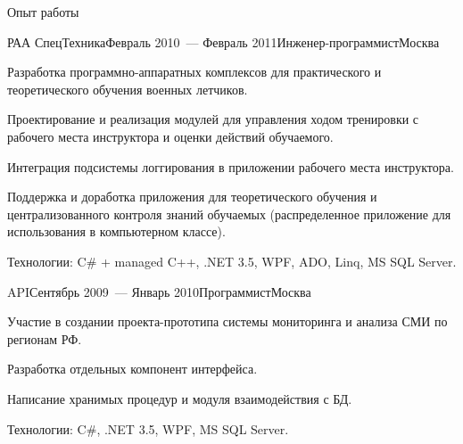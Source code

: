 \documentclass{resume} %
\begin{document}
\begin{rSection}{Опыт работы}
\begin{rSubsection}{РАА СпецТехника}{Февраль 2010~--- Февраль 2011}{Инженер-программист}{Москва}
\item Разработка программно-аппаратных комплексов для практического и теоретического обучения военных
летчиков.
\item Проектирование и реализация модулей для управления ходом тренировки с рабочего места инструктора 
и оценки действий обучаемого.
\item Интеграция подсистемы логгирования в приложении рабочего места инструктора.
\item Поддержка и доработка приложения для теоретического обучения и централизованного контроля знаний 
обучаемых (распределенное приложение для использования в компьютерном классе).
\item Технологии: C\# + managed C++, .NET 3.5, WPF, ADO, Linq, MS SQL Server.
\end{rSubsection}


\begin{rSubsection}{API}{Сентябрь 2009~--- Январь 2010}{Программист}{Москва}
\item Участие в создании проекта-прототипа системы мониторинга и анализа СМИ по регионам РФ.
\item Разработка отдельных компонент интерфейса.
\item Написание хранимых процедур и модуля взаимодействия с БД.
\item Технологии: C\#, .NET 3.5, WPF, MS SQL Server.
\end{rSubsection}

\end{rSection}

\end{document}
